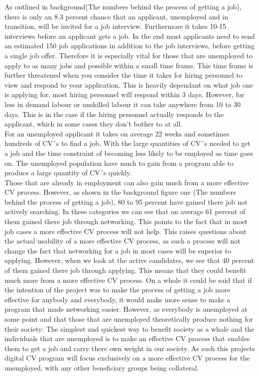 As outlined in background(The numbers behind the process of getting a job), there is only an 8.3 percent chance that an applicant, unemployed and in transition, will be invited for a job interview.
Furthermore it takes 10-15 interviews before an applicant gets a job.
In the end most applicants need to send an estimated 150 job applications in addition to the job interviews, before getting a single job offer.
Therefore it is especially vital for those that are unemployed to apply to as many jobs and possible within a small time frame. 
This time frame is further threatened when you consider the time it takes for hiring personnel to view and respond to your application.
This is heavily dependant on what job one is applying for, most hiring personnel will respond within 3 days. 
However, for less in demand labour or unskilled labour it can take anywhere from 10 to 30 days. 
This is in the case if the hiring personnel actually responds to the applicant, which in some cases they don't bother to at all. \\
For an unemployed applicant it takes on average 22 weeks and sometimes hundreds of CV´s to find a job. 
With the large quantities of CV´s needed to get a job and the time constraint of becoming less likely to be employed as time goes on.
The unemployed population have much to gain from a program able to produce a large quantity of CV´s quickly. \\

Those that are already in employment can also gain much from a more effective CV process.
However, as shown in the background figure one (The numbers behind the process of getting a job), 80 to 95 percent have gained there job not actively searching.
In these categories we can see that on average 61 percent of them gained there job through networking. 
This points to the fact that in most job cases a more effective CV process will not help.
This raises questions about the actual usability of a more effective CV process, as such a process will not change the fact that networking for a job in most cases will be superior to applying.
However, when we look at the active candidates, we see that 40 percent of them gained there job through applying. 
This means that they could benefit much more from a more effective CV process.
On a whole it could be said that if the intention of the project was to make the process of getting a job more effective for anybody and everybody, it would make more sense to make a program that made networking easier.
However, as everybody is unemployed at some point and that those that are unemployed theoretically produce nothing for their society:
The simplest and quickest way to benefit society as a whole and the individuals that are unemployed is to make an effective CV process that enables them to get a job and carry there own weight in our society.
As such this projects digital CV program will focus exclusively on a more effective CV process for the unemployed, with any other beneficiary groups being collateral\cite{Networking}. \\

